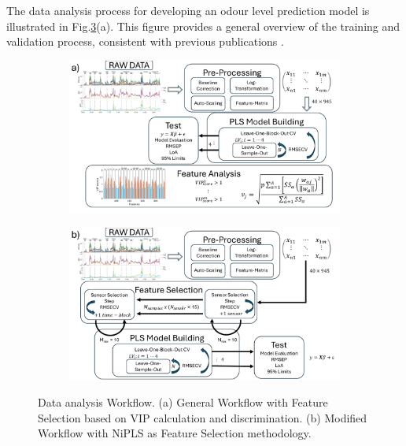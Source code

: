\documentclass[final,3p,times,twocolumn]{elsarticle}
\begin{document}
The data analysis process for developing an odour level prediction model is illustrated in Fig.\ref{fig:genWorkflow}(a). This figure provides a general overview of the training and validation process, consistent with previous publications \cite{Burgues2020,Burgues2021_Ar,Burgues2021}.

\begin{figure}[ht]
    \centering
    \begin{subfigure}[b]{\columnwidth}
        \centering
        \includegraphics[width=\linewidth]{fig4a_3.pdf}
        \label{figbgenWorkflow_a}
    \end{subfigure}
    
    \begin{subfigure}[b]{\columnwidth}
        \centering
        \includegraphics[width=\linewidth]{fig4b_3.pdf}
        \label{fig:genWorkflow_b}
    \end{subfigure}
    
    \caption{Data analysis Workflow. (a) General Workflow with Feature Selection based on VIP calculation and discrimination. (b) Modified Workflow with NiPLS as Feature Selection methodology.}
    \label{fig:genWorkflow}
\end{figure}
\end{document}
